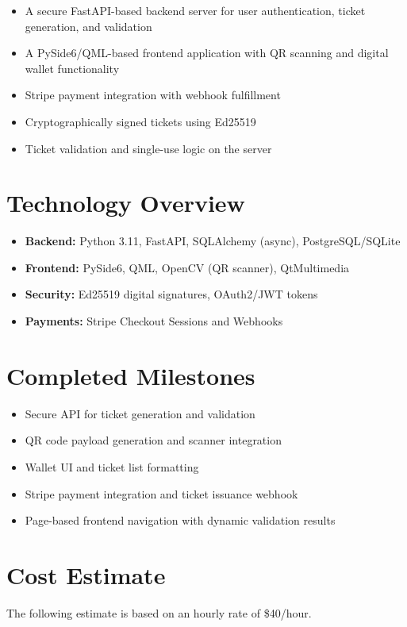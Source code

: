 \documentclass[12pt]{article}
\begin{document}
\begin{itemize}[itemsep=0.5em]
    \item A secure FastAPI-based backend server for user authentication, ticket generation, and validation
    \item A PySide6/QML-based frontend application with QR scanning and digital wallet functionality
    \item Stripe payment integration with webhook fulfillment
    \item Cryptographically signed tickets using Ed25519
    \item Ticket validation and single-use logic on the server
\end{itemize}

\section{Technology Overview}
\begin{itemize}[itemsep=0.5em]
    \item \textbf{Backend:} Python 3.11, FastAPI, SQLAlchemy (async), PostgreSQL/SQLite
    \item \textbf{Frontend:} PySide6, QML, OpenCV (QR scanner), QtMultimedia
    \item \textbf{Security:} Ed25519 digital signatures, OAuth2/JWT tokens
    \item \textbf{Payments:} Stripe Checkout Sessions and Webhooks
\end{itemize}

\section{Completed Milestones}
\begin{itemize}[itemsep=0.5em]
    \item Secure API for ticket generation and validation
    \item QR code payload generation and scanner integration
    \item Wallet UI and ticket list formatting
    \item Stripe payment integration and ticket issuance webhook
    \item Page-based frontend navigation with dynamic validation results
\end{itemize}

\section{Cost Estimate}
The following estimate is based on an hourly rate of \$40/hour.
\end{document}

